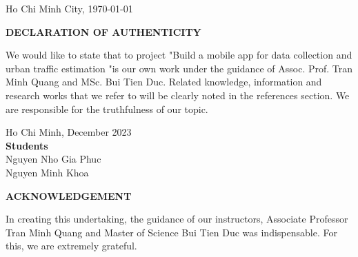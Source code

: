 \documentclass[a4paper]{article}
\begin{document}
\begin{titlepage}
\begin{center}
{Ho Chi Minh City, \today}
\end{center}
\end{titlepage}

\begin{center}
    \Large{\textbf{DECLARATION OF AUTHENTICITY}}
\end{center}
We would like to state that to project "Build a mobile app for data collection and urban traffic estimation "is our own work under the guidance of Assoc. Prof. Tran Minh Quang and MSc. Bui Tien Duc. Related knowledge, information and research works that we refer to will be clearly noted in the references section.
We are responsible for the truthfulness of our topic.

\begin{flushright}
    Ho Chi Minh, December 2023 \\
    \textbf{Students} \\
    Nguyen Nho Gia Phuc \\
    Nguyen Minh Khoa
\end{flushright}


\newpage
\begin{center}
    \Large{\textbf{ACKNOWLEDGEMENT}}
\end{center}

In creating this undertaking, the guidance of our instructors, Associate Professor Tran Minh Quang and Master of Science Bui Tien Duc was indispensable. For this, we are extremely grateful. 




\newpage
\tableofcontents
\newpage
\listoffigures
\newpage
\listoftables
\newpage







\nocite{*}
\printbibliography
\end{document}
